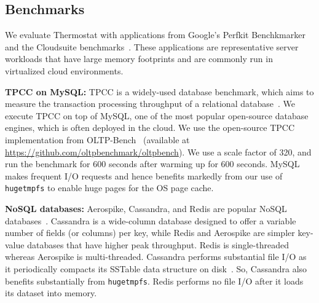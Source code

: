 


\subsection{Benchmarks}
\label{benchmarks}
We evaluate Thermostat with applications from Google's Perfkit Benchkmarker and the Cloudsuite
benchmarks~\cite{perfkitbenchmarker, cloudsuite}. These applications are representative server workloads that have
large memory footprints and are commonly run in virtualized cloud environments.

{\bf TPCC on MySQL:} TPCC is a widely-used database benchmark, which aims to measure
the transaction processing throughput of a relational database~\cite{tpcc}. We 
execute TPCC on top of MySQL, one of the most popular open-source database 
engines, which is often deployed in the cloud.  We use the open-source
TPCC implementation from OLTP-Bench~\cite{oltpbench} (available at
\url{https://github.com/oltpbenchmark/oltpbench}). We use a scale factor of
320, and run the benchmark for 600 seconds after warming up for 600 seconds.
MySQL makes frequent I/O requests and hence benefits markedly from our use
of {\tt hugetmpfs} to enable huge pages for the OS page cache.

{\bf NoSQL databases:} Aerospike, Cassandra, and Redis are popular NoSQL
databases~\cite{aerospike, cassandra, redis}.
Cassandra is a wide-column database designed to offer a variable number of fields
(or columns) per key, while Redis and Aerospike are simpler key-value databases 
that have higher peak throughput. Redis is single-threaded whereas Aerospike is
multi-threaded.
Cassandra performs substantial file I/O as it periodically compacts its SSTable
data structure on disk~\cite{ref:sstable}. So, Cassandra also benefits substantially
from {\tt hugetmpfs}. Redis performs no file I/O after it loads its dataset into memory.

